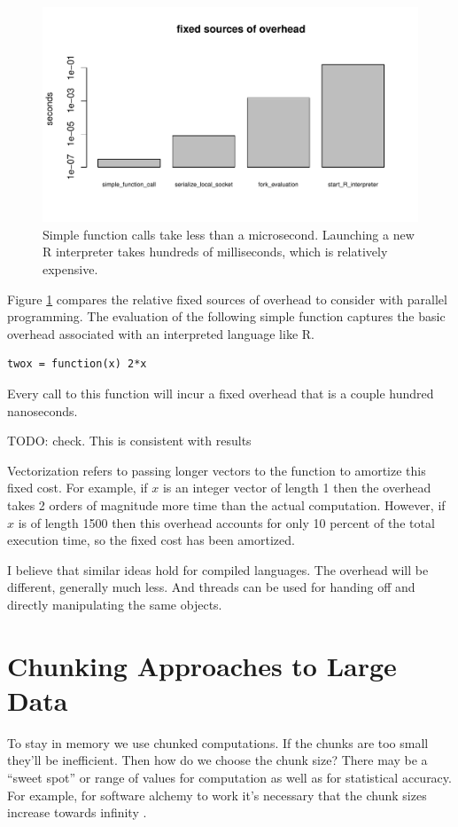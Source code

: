 \documentclass[12pt]{article}
\begin{document}
\begin{figure}
\centering
\includegraphics[width=.8\linewidth]{compute_times/overhead}
\caption{Simple function calls take less than a microsecond. Launching a
    new R interpreter takes hundreds of milliseconds, which is relatively expensive.}
\label{fig:overhead}
\end{figure}

Figure \ref{fig:overhead} compares the relative fixed sources of overhead to
consider with parallel programming. The evaluation of the following simple
function captures the basic overhead associated with an interpreted
language like R.
\begin{verbatim}
twox = function(x) 2*x
\end{verbatim}
Every call to this function will incur a fixed overhead that is a couple
hundred nanoseconds. 

TODO: check. This is consistent with results \cite{chambers2016extending}

Vectorization refers to passing longer vectors to the
function to amortize this fixed cost. For example, if $x$ is an integer
vector of length 1 then the overhead takes 2 orders of magnitude more time than
the actual computation. However, if $x$ is of length 1500 then this overhead
accounts for only 10 percent of the total execution time, so the fixed cost
has been amortized.

I believe that similar ideas hold for compiled languages. The overhead will
be different, generally much less. And threads can be used for handing off
and directly manipulating the same objects.

\section{Chunking Approaches to Large Data}

To stay in memory we use chunked computations. If the chunks are too small
they'll be inefficient. Then how do we choose the chunk size?  There may be
a ``sweet spot'' or range of values for computation as well as for
statistical accuracy. For example, for software alchemy to work it's
necessary that the chunk sizes increase towards infinity
\cite{matloff2014software}.
\end{document}
